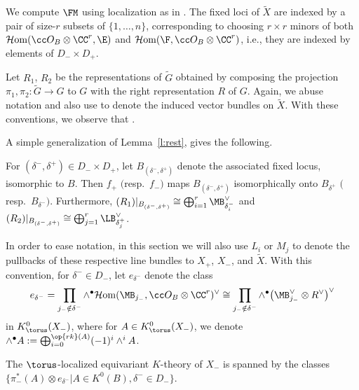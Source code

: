 We compute $\FM $ using localization as in \cite{Thomason}.
The fixed loci of $\tilde X$ are indexed by a pair of size-$r$ subsets of $\{1, \dots, n\}$,
corresponding to choosing $r \times r$ minors of both $\mathcal{H}{\rm om}(\cc O_B \otimes \CC^r, \E)$ and $\mathcal{H}{\rm om}(\F, \cc O_B \otimes \CC^r)$, i.e., they are indexed by elements of $D_- \times D_+$.

Let $R_1$, $R_2$ be the representations of $\tilde G$ obtained by composing the projection $\pi_1, \pi_2\colon \tilde G \to G$ to $G$ with the right representation $R$ of $G$. Again, we abuse notation and also use  to denote the induced vector bundles on $\tilde X$.
With these conventions, we observe that .


A simple generalization of Lemma~\ref{l:rest}, gives the following.
\begin{Lemma}\label{l:rest2}
For $(\delta^-, \delta^+) \in D_{-} \times D_{+}$,
let $B_{(\delta^-, \delta^+)} $ denote the associated fixed locus, isomorphic to $B$. Then $f_{+}$ $($resp.\ $f_-)$ maps $B_{(\delta^-, \delta^+)} $ isomorphically onto $B_{\delta^+}$ $($resp.\ $B_{\delta^-})$. Furthermore,
$(R_1)|_{B_{(\delta^-, \delta^+)}} \cong \bigoplus_{i=1}^r \MB_{\delta^-_i}^\vee$ and $(R_2)|_{B_{(\delta^-, \delta^+)}} \cong \bigoplus_{j=1}^r \LB_{\delta^+_j}^\vee$.
\end{Lemma}




In order to ease notation, in this section we will also use $L_i$ or $M_j$ to denote the pullbacks of these respective line bundles to $X_+$, $X_-$, and $\tilde X.$
With this convention, for $\delta^- \in D_-$, let $e_{\delta^-}$ denote the class{\samepage
\begin{align}
e_{\delta^-} = \prod_{j_- \notin \delta^-} \wedge^\bullet \mathcal{H}{\rm om}(\MB_{j_-}, \cc O_B \otimes \CC^r)^\vee
\cong \prod_{j_- \notin \delta^-} \wedge^\bullet \bigl(\MB_{j_-}^\vee \otimes R^\vee\bigr)^\vee \label{edm}
\end{align}
in $K^0_\torus(X_-)$, where for $A \in K^0_\torus(X_-)$, we denote $\wedge^\bullet A := \bigoplus_{i=0}^{\op{rk}(A)} (-1)^i \wedge^i A$.}



\begin{Corollary}\label{c:gen}
The $\torus$-localized equivariant $K$-theory of $X_-$ is spanned by the classes $\bigl\{\pi_-^*(A) \otimes e_{\delta^-} | A \in K^0(B), \delta^- \in D_{-}\bigr\}$.
\end{Corollary}

